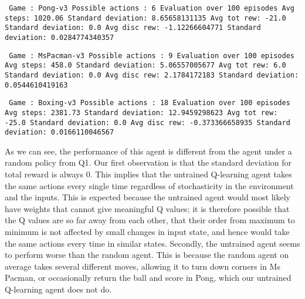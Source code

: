 \documentclass[paper=a4, fontsize=11pt]{scrartcl} %
\numberwithin{equation}{section} %
\numberwithin{figure}{section} %
\numberwithin{table}{section} %
\begin{document}
\texttt{
Game : Pong-v3 \newline
Possible actions : 6 \newline
Evaluation over 100 episodes \newline
Avg steps: 1020.06 \quad\quad\quad\quad\quad\quad\quad\quad Standard deviation: 8.65658131135 \newline
Avg tot rew: -21.0 \quad\quad\quad\quad\quad\quad\quad\quad Standard deviation: 0.0 \newline
Avg disc rew: -1.12266604771 \quad\quad\quad Standard deviation: 0.0284774340357 \newline
}

\texttt{
Game : MsPacman-v3 \newline
Possible actions : 9 \newline
Evaluation over 100 episodes \newline
Avg steps: 458.0 \quad\quad\quad\quad\quad\quad\quad\quad\quad Standard deviation: 5.06557005677 \newline
Avg tot rew: 6.0 \quad\quad\quad\quad\quad\quad\quad\quad\quad Standard deviation: 0.0 \newline
Avg disc rew: 2.1784172183 \quad\quad\quad\quad Standard deviation: 0.0544610419163 \newline
}

\texttt{
Game : Boxing-v3 \newline
Possible actions : 18 \newline
Evaluation over 100 episodes \newline
Avg steps: 2381.73 \quad\quad\quad\quad\quad\quad\quad\quad Standard deviation: 12.9459298623 \newline
Avg tot rew: -25.0 \quad\quad\quad\quad\quad\quad\quad\quad Standard deviation: 0.0 \newline
Avg disc rew: -0.373366658935 \quad\quad\quad Standard deviation: 0.0166110046567 \newline
}

As we can see, the performance of this agent is different from the agent under a random policy from Q1. Our first observation is that the standard deviation for total reward is always 0. This implies that the untrained Q-learning agent takes the same actions every single time regardless of stochasticity in the environment and the inputs. This is expected because the untrained agent would most likely have weights that cannot give meaningful Q values; it is therefore possible that the Q values are so far away from each other, that their order from maximum to minimum is not affected by small changes in input state, and hence would take the same actions every time in similar states. Secondly, the untrained agent seems to perform worse than the random agent. This is because the random agent on average takes several different moves, allowing it to turn down corners in Ms Pacman, or occasionally return the ball and score in Pong, which our untrained Q-learning agent does not do.\\
\end{document}

